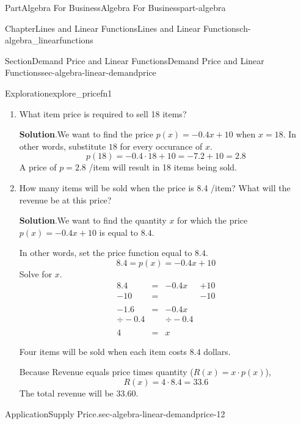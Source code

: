 \documentclass{tufte-book}
\newcommand{\blocktitlefont}{\relax}
\numberwithin{equation}{chapter}
\newcommand{\amp}{&}
\begin{document}
\begin{partptx}{Part}{Algebra For Business}{}{Algebra For Business}{}{}{part-algebra}
\begin{chapterptx}{Chapter}{Lines and Linear Functions}{}{Lines and Linear Functions}{}{}{ch-algebra_linearfunctions}
\begin{sectionptx}{Section}{Demand Price and Linear Functions}{}{Demand Price and Linear Functions}{}{}{sec-algebra-linear-demandprice}
\begin{exploration}{Exploration}{}{explore_pricefn1}
\begin{enumerate}[font=\bfseries,label=(\alph*),ref=\alph*]
\begin{equation*}
p(x) = -0.4 (x - 15) + 4
\end{equation*}
Simplifying this, we get%
\begin{equation*}
p(x) = -0.4x + 10
\end{equation*}
%
\item{}What item price is required to sell 18 items?%
\par\smallskip%
\noindent\textbf{\blocktitlefont Solution}.\hypertarget{explore_pricefn1-3-2}{}\quad{}We want to find the price \(p(x)=-0.4x+10\) when \(x=18\).  In other words, substitute \(18\) for every occurance of \(x\).%
\begin{equation*}
p(18) = -0.4\cdot 18 + 10 = -7.2 + 10 = 2.8
\end{equation*}
A price of \(p=2.8\) \textdollar{}\slash{}item will result in 18 items being sold.%
\item{}How many items will be sold when the price is 8.4 \textdollar{}\slash{}item?  What will the revenue be at this price?%
\par\smallskip%
\noindent\textbf{\blocktitlefont Solution}.\hypertarget{explore_pricefn1-4-2}{}\quad{}We want to find the quantity \(x\) for which the price \(p(x)=-0.4x+10\) is equal to \(8.4\).%
\par
In other words, set the price function equal to \(8.4\).%
\begin{equation*}
8.4 = p(x) = -0.4x + 10
\end{equation*}
Solve for \(x\).%
\begin{align*}
8.4 	\amp = \amp-0.4x \amp + 10\\
- 10 	\amp = \amp 	 \amp  -10\\
\amp \amp \amp \\
-1.6    \amp = \amp -0.4x \amp \\
\div -0.4 \amp \amp \div -0.4\\
\amp \amp \amp \\
4 \amp= \amp x \amp 
\end{align*}
%
\par
Four items will be sold when each item costs \(8.4\) dollars.%
\par
Because Revenue equals price times quantity (\(R(x) = x \cdot p(x)\)),%
\begin{equation*}
R(x) = 4 \cdot 8.4 = 33.6
\end{equation*}
The total revenue will be \textdollar{}33.60.%
\end{enumerate}%
\end{exploration}%
\begin{insight}{Application}{Supply Price.}{sec-algebra-linear-demandprice-12}%

\end{insight}
\end{sectionptx}
\end{chapterptx}
\end{partptx}
\end{document}
